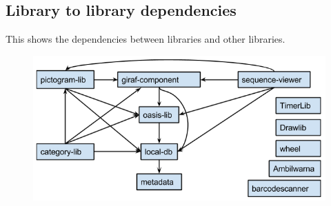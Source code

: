 \subsection{Library to library dependencies}
This shows the dependencies between libraries and other libraries.

\begin{figure}[H]
	\centering
	\includegraphics[width=0.8 \textwidth]{pictures/LibLibDependenciesWiki.png}
	\caption{}
	\label{AppAppDependenciesWiki}
\end{figure}